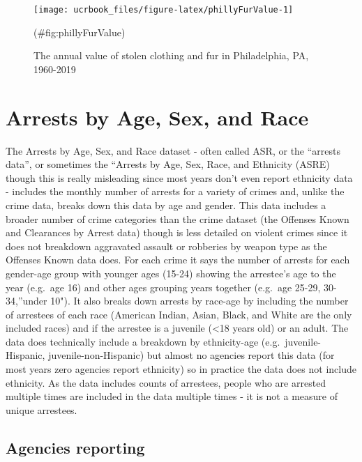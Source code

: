 \documentclass[
  12pt,
  openany]{book}
\begin{document}
\begin{figure}

{\centering \texttt{[image: ucrbook\_files/figure-latex/phillyFurValue-1]} 

}

\caption{The annual value of stolen clothing and fur in Philadelphia, PA, 1960-2019}(\#fig:phillyFurValue)
\end{figure}

\hypertarget{arrests}{%
\chapter{Arrests by Age, Sex, and Race}\label{arrests}}

The Arrests by Age, Sex, and Race dataset - often called ASR, or the ``arrests data'', or sometimes the ``Arrests by Age, Sex, Race, and Ethnicity (ASRE) though this is really misleading since most years don't even report ethnicity data - includes the monthly number of arrests for a variety of crimes and, unlike the crime data, breaks down this data by age and gender. This data includes a broader number of crime categories than the crime dataset (the Offenses Known and Clearances by Arrest data) though is less detailed on violent crimes since it does not breakdown aggravated assault or robberies by weapon type as the Offenses Known data does. For each crime it says the number of arrests for each gender-age group with younger ages (15-24) showing the arrestee's age to the year (e.g.~age 16) and other ages grouping years together (e.g.~age 25-29, 30-34,''under 10"). It also breaks down arrests by race-age by including the number of arrestees of each race (American Indian, Asian, Black, and White are the only included races) and if the arrestee is a juvenile (\textless18 years old) or an adult. The data does technically include a breakdown by ethnicity-age (e.g.~juvenile-Hispanic, juvenile-non-Hispanic) but almost no agencies report this data (for most years zero agencies report ethnicity) so in practice the data does not include ethnicity. As the data includes counts of arrestees, people who are arrested multiple times are included in the data multiple times - it is not a measure of unique arrestees.

\hypertarget{agencies-reporting-2}{%
\section{Agencies reporting}\label{agencies-reporting-2}}
\end{document}

